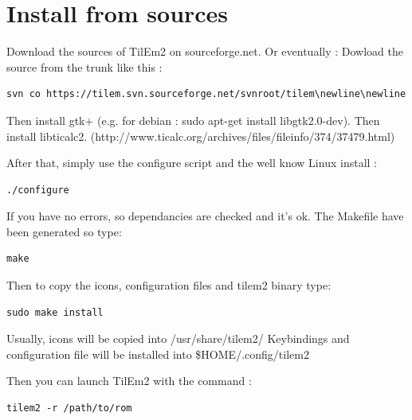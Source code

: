 \documentclass[10pt]{report}
\begin{document}
\section{Install from sources}
Download the sources of TilEm2 on sourceforge.net.\newline
Or eventually :\newline
Dowload the source from the trunk like this :\newline
\begin{lstlisting}
svn co https://tilem.svn.sourceforge.net/svnroot/tilem\newline\newline
\end{lstlisting}

Then install gtk+ (e.g. for debian : sudo apt-get install libgtk2.0-dev).\newline
Then install libticalc2.\newline\newline
(http://www.ticalc.org/archives/files/fileinfo/374/37479.html)\newline\newline

After that, simply use the configure script and the well know Linux install :\newline
\begin{lstlisting}
./configure
\end{lstlisting}
If you have no errors, so dependancies are checked and it's ok.\newline
The Makefile have been generated so type:\newline
\begin{lstlisting}
make
\end{lstlisting}
Then to copy the icons, configuration files and tilem2 binary type:\newline
\begin{lstlisting}
sudo make install
\end{lstlisting}

Usually, icons will be copied into /usr/share/tilem2/\newline
Keybindings and configuration file will be installed into \$HOME/.config/tilem2\newline

Then you can launch TilEm2 with the command :\newline
\begin{lstlisting}
tilem2 -r /path/to/rom
\end{lstlisting}
\end{document}
